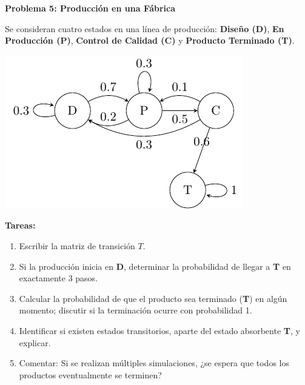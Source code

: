 \documentclass{article}
\begin{document}
\begin{problem}
\textbf{Problema 5: Producción en una Fábrica}

Se consideran cuatro estados en una línea de producción: \textbf{Diseño (D)}, \textbf{En Producción (P)}, \textbf{Control de Calidad (C)} y \textbf{Producto Terminado (T)}.

\begin{center}
\includegraphics[scale=1]{images/trabajo03-1.pdf}
\end{center}

\textbf{Tareas:}
\begin{enumerate}
    \item Escribir la matriz de transición \(T\).
    \item Si la producción inicia en \textbf{D}, determinar la probabilidad de llegar a \textbf{T} en exactamente 3 pasos.
    \item Calcular la probabilidad de que el producto sea terminado (\textbf{T}) en algún momento; discutir si la terminación ocurre con probabilidad 1.
    \item Identificar si existen estados transitorios, aparte del estado absorbente \textbf{T}, y explicar.
    \item Comentar: Si se realizan múltiples simulaciones, ¿se espera que todos los productos eventualmente se terminen?
\end{enumerate}
\end{problem}
\end{document}
